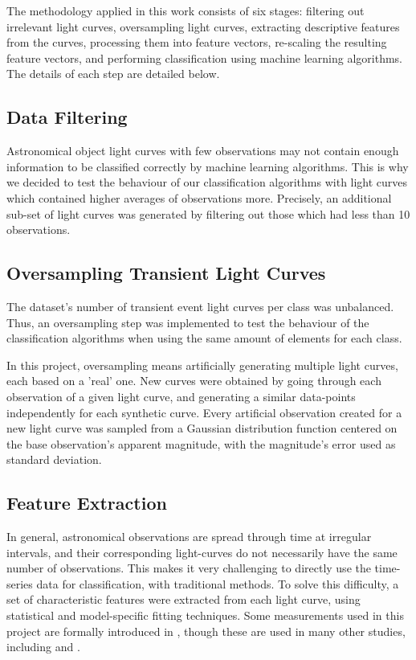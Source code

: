 The methodology applied in this work consists of six stages: filtering out irrelevant light curves, oversampling light curves, extracting descriptive features from the curves, processing them into feature vectors, re-scaling the resulting feature vectors, and performing classification using machine learning algorithms. The details of each step are detailed below.

\subsection{Data Filtering}

Astronomical object light curves with few observations may not contain enough information to be classified correctly by machine learning algorithms. 
This is why we decided to test the behaviour of our classification algorithms with light curves which contained higher averages of observations more. Precisely, an additional sub-set of light curves was generated by filtering out those which had less than 10 observations.


\subsection{Oversampling Transient Light Curves}

The dataset's number of transient event light curves per class was unbalanced. Thus, an oversampling step was implemented to test the behaviour of the classification algorithms when using the same amount of elements for each class.

In this project, oversampling means artificially generating multiple light curves, each based on a 'real' one. New curves were obtained by going through each observation of a given light curve, and generating a similar data-points independently for each synthetic curve. Every artificial observation created for a new light curve was sampled from a Gaussian distribution function centered on the base observation's apparent magnitude, with the magnitude's error used as standard deviation.

\subsection{Feature Extraction}

In general, astronomical observations are spread through time at irregular intervals, and their corresponding light-curves do not necessarily have the same number of observations. This makes it very challenging to directly use the time-series data for classification, with traditional methods. To solve this difficulty, a set of characteristic features were extracted from each light curve, using statistical and model-specific fitting techniques. Some measurements used in this project are formally introduced in \cite{1101.1959}, though these are used in many other studies, including \cite{1603.00882} and \cite{1601.03931}.

